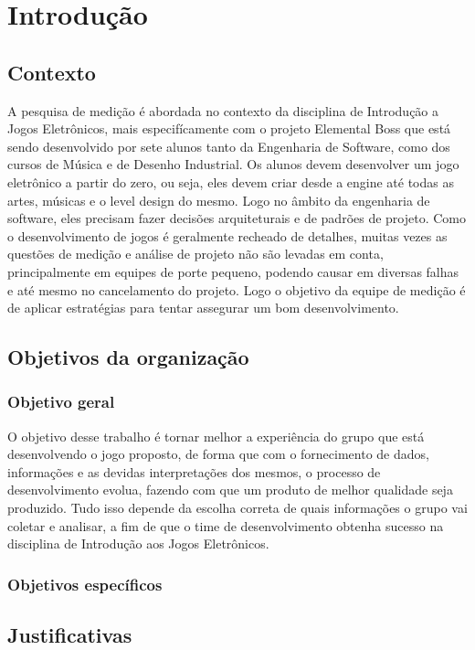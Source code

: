 \chapter{Introdução}

\section{Contexto}
	
	A pesquisa de medição é abordada no contexto da disciplina de Introdução a Jogos Eletrônicos, mais especifícamente com o projeto Elemental Boss que está sendo desenvolvido por sete alunos tanto da Engenharia de Software, como dos cursos de Música e de Desenho Industrial. Os alunos devem desenvolver um jogo eletrônico a partir do zero, ou seja, eles devem criar desde a engine até todas as artes, músicas e o level design do mesmo. Logo no âmbito da engenharia de software, eles precisam fazer decisões arquiteturais e de padrões de projeto.
	Como o desenvolvimento de jogos é geralmente recheado de detalhes, muitas vezes as questões de medição e análise de projeto não são levadas em conta, principalmente em equipes de porte pequeno, podendo causar em diversas falhas e até mesmo no cancelamento do projeto. Logo o objetivo da equipe de medição é de aplicar estratégias para tentar assegurar um bom desenvolvimento.


\section{Objetivos da organização}

\subsection{Objetivo geral}
	O objetivo desse trabalho é tornar melhor a experiência do grupo que está desenvolvendo o jogo proposto, de forma que com o fornecimento de dados, informações e as devidas interpretações dos mesmos, o processo de desenvolvimento evolua, fazendo com que um produto de melhor qualidade seja produzido. Tudo isso depende da escolha correta de quais informações o grupo vai coletar e analisar, a fim de que o time de desenvolvimento obtenha sucesso na disciplina de Introdução aos Jogos Eletrônicos.

\subsection{Objetivos específicos}


\section{Justificativas}
  
